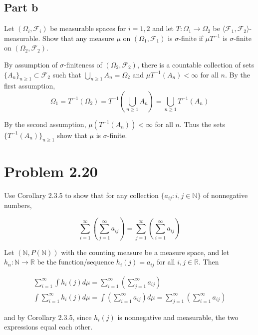 \documentclass{article}
\newcommand{\R}{\mathbb{R}}
\newcommand{\N}{\mathbb{N}}
\newcommand{\F}{\mathcal{F}}
\begin{document}
\subsection*{Part b}

Let $(\Omega_i, \F_i)$ be measurable spaces for $i = 1, 2$ and let $T: \Omega_1 \rightarrow \Omega_2$ be $\langle \F_1, \F_2 \rangle$-measurable. Show that any measure $\mu$ on $(\Omega_1, \F_1)$ is $\sigma$-finite if $\mu T^{-1}$ is $\sigma$-finite on $(\Omega_2, \F_2)$.

By assumption of $\sigma$-finiteness of $(\Omega_2, \F_2)$, there is a countable collection of sets $\{A_n\}_{n \geq 1} \subset \F_2$ such that $\bigcup_{n \geq 1} A_n = \Omega_2$ and $\mu T^{-1}(A_n) < \infty$ for all $n$. By the first assumption,
\[
\Omega_1 = T^{-1}(\Omega_2) = T^{-1}\left( \bigcup_{n \geq 1} A_n \right) = \bigcup_{n \geq 1} T^{-1}(A_n)
\]

By the second assumption, $\mu(T^{-1}(A_n)) < \infty$ for all $n$. Thus the sets $\{T^{-1}(A_n)\}_{n \geq 1}$ show that $\mu$ is $\sigma$-finite.

\section*{Problem 2.20}

Use Corollary 2.3.5 to show that for any collection $\{a_{ij}: i,j \in \N\}$ of nonnegative numbers,

\[
\sum_{i=1}^\infty \left( \sum_{j=1}^\infty a_{ij} \right) = \sum_{j=1}^\infty \left( \sum_{i=1}^\infty a_{ij} \right)
\]

Let $(\N, P(\N))$ with the counting measure be a measure space, and let $h_n: \N \rightarrow \R$ be the function/sequence $h_i(j) = a_{ij}$ for all $i, j \in \R$. Then

\begin{gather*}
\sum_{i=1}^\infty \int h_i(j) d\mu = \sum_{i=1}^\infty \left( \sum_{j=1}^\infty a_{ij} \right) \\
\int \sum_{i=1}^\infty h_i(j) d\mu = \int \left( \sum_{i=1}^\infty a_{ij} \right) d\mu = \sum_{j=1}^\infty \left( \sum_{i=1}^\infty a_{ij} \right)
\end{gather*}

and by Corollary 2.3.5, since $h_i(j)$ is nonnegative and measurable, the two expressions equal each other.
\end{document}
